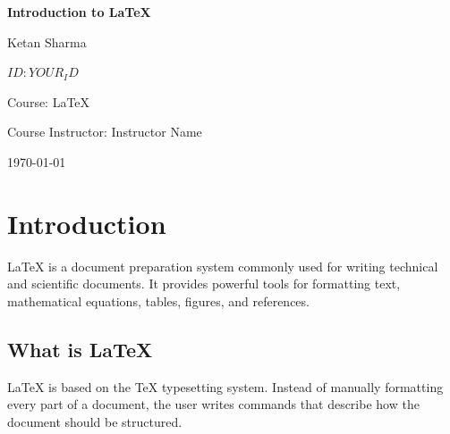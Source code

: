 \documentclass[12pt,a4paper]{report}
\begin{document}
	
	\begin{titlepage}
		\centering
		
		\vspace*{2cm}
		
		{\Huge\bfseries Introduction to LaTeX\par}
		
		\vspace{1.5cm}
		
		{\Large Ketan Sharma\par}
		
		\vspace{0.5cm}
		
		$ID: YOUR_ID$
		
		\vspace{1cm}
		
		Course: LaTeX
		
		\vspace{0.5cm}
		
		Course Instructor: Instructor Name
		
		\vfill
		
		{\large \today\par}
		
	\end{titlepage}
	
	\thispagestyle{empty}
	
	\begin{abstract}
		This document provides a brief introduction to LaTeX and demonstrates
		the use of different document formatting features. It covers title pages,
		abstracts, chapters, sections, subsections, colors, headers, footers,
		and page formatting.
	\end{abstract}
	
	\chapter{Introduction}
	
	LaTeX is a document preparation system commonly used for writing
	technical and scientific documents. It provides powerful tools for
	formatting text, mathematical equations, tables, figures, and references.
	
	\section{What is LaTeX}
	
	LaTeX is based on the TeX typesetting system. Instead of manually
	formatting every part of a document, the user writes commands that
	describe how the document should be structured.
	
\end{document}
